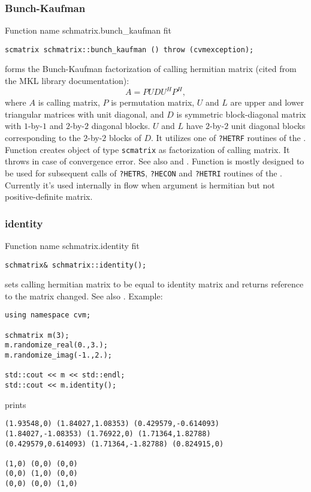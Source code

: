 \subsubsection{Bunch-Kaufman}
Function%
\pdfdest name {schmatrix.bunch_kaufman} fit
\begin{verbatim}
scmatrix schmatrix::bunch_kaufman () throw (cvmexception);
\end{verbatim}
forms the Bunch-Kaufman factorization of  calling hermitian matrix 
(cited from the MKL library documentation):
\begin{equation*}
A=PUDU^HP^H,
\end{equation*}
where $A$ is calling matrix,
$P$ is  permutation matrix, $U$ and $L$ are upper and lower triangular
matrices with unit diagonal, and $D$ is  symmetric 
block-diagonal matrix with $1$-by-$1$ and $2$-by-$2$
diagonal blocks. $U$ and $L$ have $2$-by-$2$ unit diagonal 
blocks corresponding to the $2$-by-$2$ blocks of $D$.
It utilizes one of \verb"?HETRF" routines of the
.
Function
creates  object of type \verb"scmatrix" as 
 factorization of  calling matrix.
It throws  
in case of convergence error.
See also
 and
.
Function is mostly designed to be used for subsequent calls
of \verb"?HETRS", \verb"?HECON" and \verb"?HETRI" routines of the
.
Currently it's used internally in  flow
when argument is hermitian but not positive-definite matrix.
\newpage




\subsubsection{identity}
Function%
\pdfdest name {schmatrix.identity} fit
\begin{verbatim}
schmatrix& schmatrix::identity();
\end{verbatim}
sets  calling hermitian matrix to be equal to identity matrix
and returns  reference to
the matrix changed. 
See also .
Example:
\begin{Verbatim}
using namespace cvm;

schmatrix m(3);
m.randomize_real(0.,3.);
m.randomize_imag(-1.,2.);

std::cout << m << std::endl;
std::cout << m.identity();
\end{Verbatim}
prints
\begin{Verbatim}
(1.93548,0) (1.84027,1.08353) (0.429579,-0.614093)
(1.84027,-1.08353) (1.76922,0) (1.71364,1.82788)
(0.429579,0.614093) (1.71364,-1.82788) (0.824915,0)

(1,0) (0,0) (0,0)
(0,0) (1,0) (0,0)
(0,0) (0,0) (1,0)
\end{Verbatim}
\newpage



